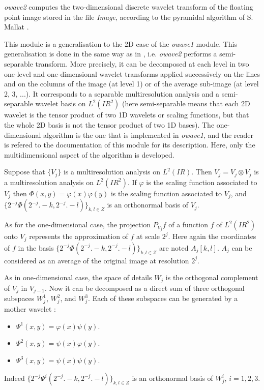 \def\real{I\!\!R}

{\em owave2} computes the two-dimensional discrete wavelet transform 
of the floating point image stored in the file {\em Image}, 
according to the pyramidal algorithm of S. Mallat \cite{kn:ma1}. 

This module is a generalisation to the 2D case of the {\em owave1} module. 
This generalisation is done in the same way as in \cite{kn:ma1}, i.e. 
{\em owave2}  performs a semi-separable transform. More precisely, 
it can be decomposed at each level in two one-level and one-dimensional 
wavelet transforms applied successively on the lines and on the columns 
of the image (at level 1) or of the average sub-image (at level 2, 3, ...). 
It corresponds to a separable multiresolution analysis 
and a semi-separable wavelet basis on \( L^{2}(\real^{2}) \) 
(here semi-separable means that each 2D wavelet is the tensor product 
of two 1D wavelets or scaling functions, but that the whole 2D basis 
is not the tensor product of two 1D bases). 
The one-dimensional algorithm is the one that is implemented in {\em owave1}, 
and the reader is refered to the documentation of this module 
for its description. Here, only the multidimensional aspect of the algorithm 
is developed. 

Suppose that \( \{V_{j}\} \) is a multiresolution analysis on $L^{2}(\real)$. 
Then ${ V}_{j} = V_{j} \otimes V_{j}$ is a multiresolution 
analysis on $L^{2}(\real^{2})$. If $\varphi$ is the scaling function 
associated to $V_{j}$ then $\Phi(x,y) = \varphi(x) \varphi(y)$ 
is the scaling function associated to ${ V}_{j}$, 
and $\{ 2^{-j} \Phi(2^{-j}. - k, 2^{-j}. - l)\}_{k,l \in Z}$ is an orthonormal 
basis of ${ V}_{j}$.

As for the one-dimensional case, the projection $P_{{ V}_{j}} f$ 
of a function $f$ of $L^{2}(\real^{2})$ onto ${ V}_{j}$ represents 
the approximation of \( f \) at scale \( 2^{j} \). Here again the coordinates 
of $f$ in the basis  $\{ 2^{-j} \Phi(2^{-j}. - k, 2^{-j}. - l)\}_{k,l \in Z}$ 
are noted \( A_{j}[k,l] \). $A_j$ can be considered as an average 
of the original image at resolution $2^j$.


As in one-dimensional case, the space of details ${ W}_{j}$ 
is the orthogonal complement of ${ V}_{j}$ in ${ V}_{j-1}$. 
Now it can be decomposed as a direct sum of three orthogonal subspaces 
${ W}^{1}_{j}$, ${ W}^{2}_{j}$, and ${ W}^{3}_{j}$. 
Each of these subspaces can be generated by a mother wavelet :
\begin{itemize}
\item
\( \Psi^{1}(x,y) = \varphi(x) \psi(y) \).
\item
\( \Psi^{2}(x,y) = \psi(x) \varphi(y) \).
\item
\( \Psi^{3}(x,y) = \psi(x) \psi(y) \).
\end{itemize}
Indeed \( \{ 2^{-j} \Psi^{i}(2^{-j}. - k, 2^{-j}. - l)\}_{k,l \in Z} \) 
is an orthonormal basis of ${ W}^{i}_{j}$, $i=1,2,3$.

